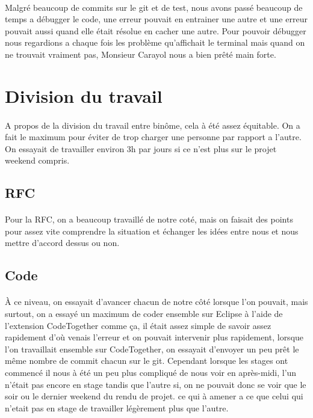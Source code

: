\documentclass[a4paper,titlepage]{report}
\begin{document}
\paragraph{}
Malgré beaucoup de commits sur le git et de test, nous avons passé beaucoup de temps a débugger le code, une erreur pouvait en entrainer une autre et une erreur pouvait aussi quand elle était résolue en cacher une autre. Pour pouvoir débugger nous regardions a chaque fois les problème qu'affichait le terminal mais quand on ne trouvait vraiment pas, Monsieur Carayol nous a bien prêté main forte. 




\pagebreak
\section{Division du travail}
\paragraph{}
A propos de la division du travail entre binôme, cela à été assez équitable. On a fait le maximum pour éviter de trop charger une personne par rapport a l'autre. On essayait de travailler environ 3h par jours si ce n'est plus sur le projet weekend compris.
\subsection{RFC}
\paragraph{}
Pour la RFC, on a beaucoup travaillé de notre coté, mais on faisait des points pour assez vite comprendre la situation et échanger les idées entre nous et nous mettre d'accord dessus ou non.
\subsection{Code}
\paragraph{}
À ce niveau, on essayait d'avancer chacun de notre côté lorsque l'on pouvait, mais surtout, on a essayé un maximum de coder ensemble sur Eclipse à l'aide de l'extension CodeTogether comme ça, il était assez simple de savoir assez rapidement d'où venais l'erreur et on pouvait intervenir plus rapidement, lorsque l'on travaillait ensemble sur CodeTogether, on essayait d'envoyer un peu prêt le même nombre de commit chacun sur le git. Cependant lorsque les stages ont commencé il nous à été un peu plus compliqué de nous voir en après-midi, l'un n'était pas encore en stage tandis que l'autre si, on ne pouvait donc se voir que le soir ou le dernier weekend du rendu de projet. ce qui à amener a ce que celui qui n'etait pas en stage de travailler légèrement plus que l'autre.
\end{document}
